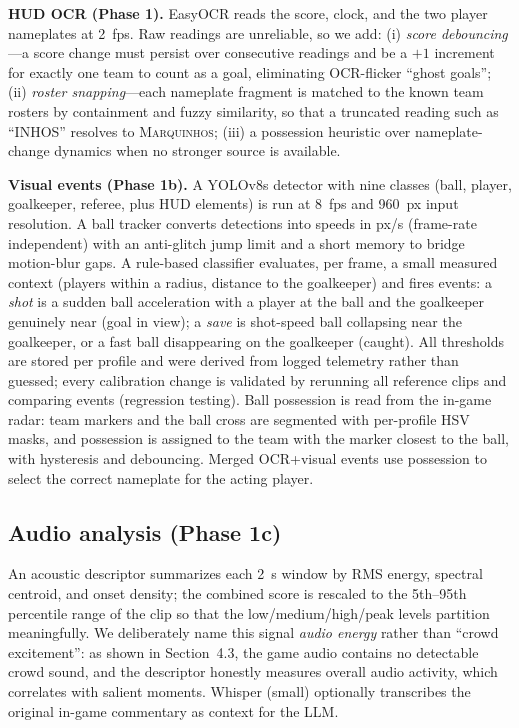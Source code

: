 \documentclass[10pt,twocolumn,a4paper]{article}
\begin{document}
	\textbf{HUD OCR (Phase 1).} EasyOCR reads the score, clock, and the two player nameplates at 2~fps. Raw readings are unreliable, so we add: (i) \emph{score debouncing}---a score change must persist over consecutive readings and be a $+1$ increment for exactly one team to count as a goal, eliminating OCR-flicker ``ghost goals''; (ii) \emph{roster snapping}---each nameplate fragment is matched to the known team rosters by containment and fuzzy similarity, so that a truncated reading such as ``INHOS'' resolves to \textsc{Marquinhos}; (iii) a possession heuristic over nameplate-change dynamics when no stronger source is available.

	\textbf{Visual events (Phase 1b).} A YOLOv8s detector with nine classes (ball, player, goalkeeper, referee, plus HUD elements) is run at 8~fps and 960~px input resolution. A ball tracker converts detections into speeds in px/s (frame-rate independent) with an anti-glitch jump limit and a short memory to bridge motion-blur gaps. A rule-based classifier evaluates, per frame, a small measured context (players within a radius, distance to the goalkeeper) and fires events: a \emph{shot} is a sudden ball acceleration with a player at the ball and the goalkeeper genuinely near (goal in view); a \emph{save} is shot-speed ball collapsing near the goalkeeper, or a fast ball disappearing on the goalkeeper (caught). All thresholds are stored per profile and were derived from logged telemetry rather than guessed; every calibration change is validated by rerunning all reference clips and comparing events (regression testing). Ball possession is read from the in-game radar: team markers and the ball cross are segmented with per-profile HSV masks, and possession is assigned to the team with the marker closest to the ball, with hysteresis and debouncing. Merged OCR+visual events use possession to select the correct nameplate for the acting player.

	\subsection{Audio analysis (Phase 1c)}

	An acoustic descriptor summarizes each 2~s window by RMS energy, spectral centroid, and onset density; the combined score is rescaled to the 5th--95th percentile range of the clip so that the low/medium/high/peak levels partition meaningfully. We deliberately name this signal \emph{audio energy} rather than ``crowd excitement'': as shown in Section~4.3, the game audio contains no detectable crowd sound, and the descriptor honestly measures overall audio activity, which correlates with salient moments. Whisper (small) optionally transcribes the original in-game commentary as context for the LLM.
\end{document}
